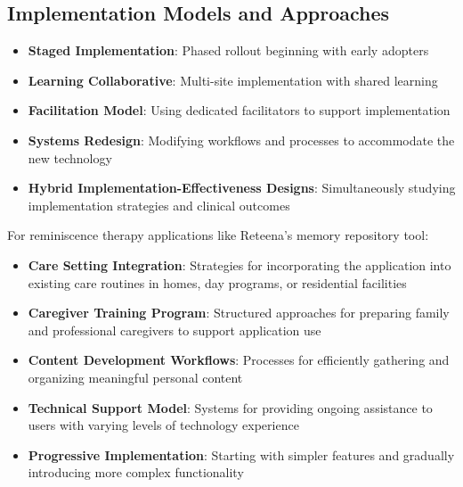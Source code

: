 \subsection{Implementation Models and Approaches}
\begin{itemize}
    \item \textbf{Staged Implementation}: Phased rollout beginning with early adopters
    
    \item \textbf{Learning Collaborative}: Multi-site implementation with shared learning
    
    \item \textbf{Facilitation Model}: Using dedicated facilitators to support implementation
    
    \item \textbf{Systems Redesign}: Modifying workflows and processes to accommodate the new technology
    
    \item \textbf{Hybrid Implementation-Effectiveness Designs}: Simultaneously studying implementation strategies and clinical outcomes
\end{itemize}

\begin{tcolorbox}[infobox, title=Implementation Considerations for Reminiscence Therapy Applications]
For reminiscence therapy applications like Reteena's memory repository tool:
\begin{itemize}
    \item \textbf{Care Setting Integration}: Strategies for incorporating the application into existing care routines in homes, day programs, or residential facilities
    
    \item \textbf{Caregiver Training Program}: Structured approaches for preparing family and professional caregivers to support application use
    
    \item \textbf{Content Development Workflows}: Processes for efficiently gathering and organizing meaningful personal content
    
    \item \textbf{Technical Support Model}: Systems for providing ongoing assistance to users with varying levels of technology experience
    
    \item \textbf{Progressive Implementation}: Starting with simpler features and gradually introducing more complex functionality
\end{itemize}
\end{tcolorbox}

